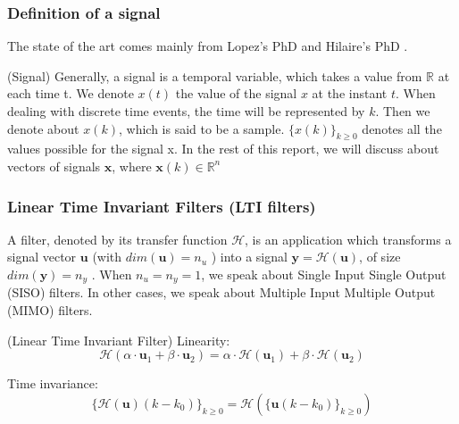 	\subsubsection{Definition of a signal}
	The state of the art comes mainly from Lopez's PhD \cite{lopez} and Hilaire's PhD \cite{hilaire}.

	\begin{thdef}\label{sig} (Signal)
		Generally, a signal is a temporal variable, which takes a value from $\mathbb{R}$ at each time t.
		We denote $x(t)$ the value of the signal $x$ at the instant $t$.
		When dealing with discrete time events, the time will be represented by $k$.
		Then we denote about $x(k)$, which is said to be a sample.
		$\{x(k)\}_{k \geq 0}$ denotes all the values possible for the signal x.
		In the rest of this report, we will discuss about vectors of signals $\textbf{x}$, where $\textbf{x}(k) \in \mathbb{R}^{n}$
	\end{thdef}

	\subsubsection{Linear Time Invariant Filters (LTI filters)}
	A filter, denoted by its transfer function $\mathcal{H}$, is an application which transforms a signal vector $\boldsymbol{u}$ (with $dim(\boldsymbol{u}) = n_u$ )
	into a signal $\boldsymbol{y} = \mathcal{H}(\boldsymbol{u})$, of size $dim(\boldsymbol{y}) = n_y$ . When $n_u = n_y = 1$, we speak about Single Input Single Output
	(SISO) filters. In other cases, we speak about Multiple Input Multiple Output (MIMO) filters.

	\begin{thdef} (Linear Time Invariant Filter)
		Linearity:
		$$ \mathcal{H}(\alpha \cdot \boldsymbol{u}_1+ \beta \cdot \boldsymbol{u}_2)= \alpha\cdot\mathcal{H}(\boldsymbol{u}_1) +  \beta\cdot\mathcal{H}(\boldsymbol{u}_2)$$

		Time invariance:
		$$ \{\mathcal{H}(\boldsymbol{u})(k-k_0)\}_{k\geq0} = \mathcal{H}(\{\boldsymbol{u}(k-k_0)\}_{k \geq 0} ) $$
	\end{thdef}

